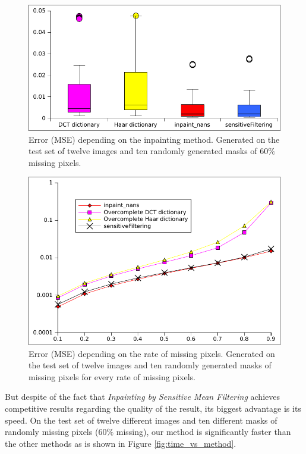 \documentclass[10pt,conference,compsocconf]{IEEEtran}
\begin{document}
\begin{figure}[ht]
\centering
 \includegraphics[width = \linewidth]{images/errorDependingOnAlgorithm.pdf}
\caption[]{Error (MSE) depending on the inpainting method. Generated on the test set of twelve images and ten randomly generated masks of $60\%$ missing pixels.\label{fig:error_vs_algorithm}}
\end{figure}

\begin{figure}[ht]
\centering
 \includegraphics[width = \linewidth]{images/errorDependingOnMissingPixels.pdf}
\caption[]{Error (MSE) depending on the rate of missing pixels. Generated on the test set of twelve images and ten randomly generated masks of missing pixels for every rate of missing pixels.\label{fig:error_vs_missing_pixels}}
\end{figure}

But despite of the fact that \emph{Inpainting by Sensitive Mean Filtering} achieves competitive results regarding the quality of the result, its biggest advantage is its speed. On the test set of twelve different images and ten different masks of randomly missing pixels ($60\%$ missing), our method is significantly faster than the other methods as is shown in Figure \ref{fig:time_vs_method}. %
\end{document}
